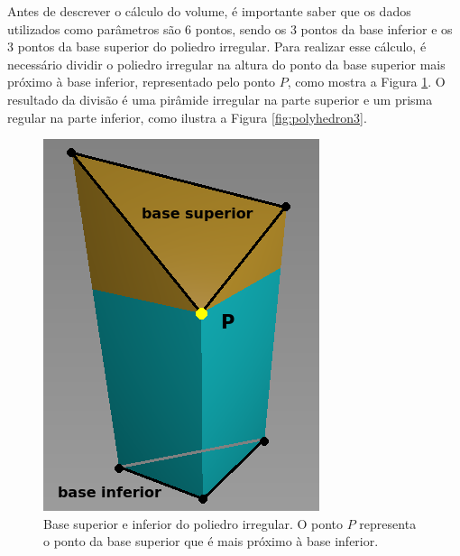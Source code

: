 Antes de descrever o cálculo do volume, é importante saber que os dados utilizados como parâmetros são 6 pontos, sendo os 3 pontos da base inferior e os 3 pontos da base superior do poliedro irregular.
Para realizar esse cálculo, é necessário dividir o poliedro irregular na altura do ponto da base superior mais próximo à base inferior, representado pelo ponto $P$, como mostra a Figura \ref{fig:pol_sep3}.
O resultado da divisão é uma pirâmide irregular na parte superior e um prisma regular na parte inferior, como ilustra a Figura \ref{fig:polyhedron3}.

\begin{figure}[H]
    \centering
    \includegraphics[scale=0.7]{dados/figuras/pol_sep3.png}
    \caption{Base superior e inferior do poliedro irregular. O ponto $P$ representa o ponto da base superior que é mais próximo à base inferior.}
    \label{fig:pol_sep3}
\end{figure}

